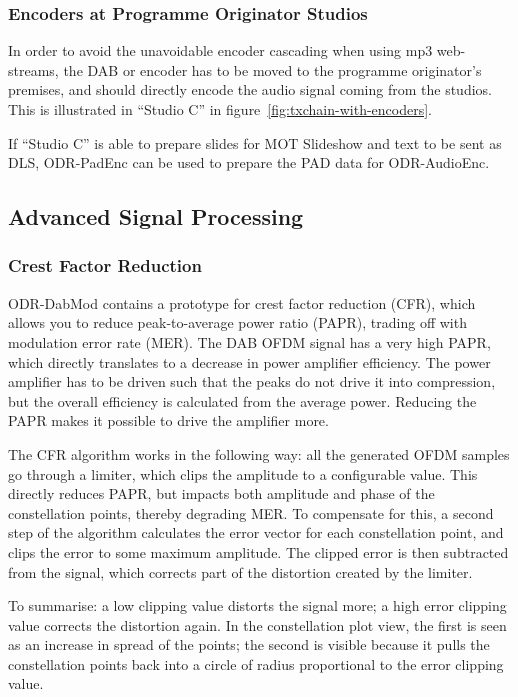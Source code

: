 \subsubsection{Encoders at Programme Originator Studios}
In order to avoid the unavoidable encoder cascading when using mp3 web-streams,
the DAB or \dabplus encoder has to be moved to the programme originator's
premises, and should directly encode the audio signal coming from the studios.
This is illustrated in ``Studio C'' in figure~\ref{fig:txchain-with-encoders}.

If ``Studio C'' is able to prepare slides for MOT Slideshow and text to be sent
as DLS, ODR-PadEnc can be used to prepare the PAD data for ODR-AudioEnc.


\subsection{Advanced Signal Processing}
\subsubsection{Crest Factor Reduction}
ODR-DabMod contains a prototype for crest factor reduction (CFR), which allows you to
reduce peak-to-average power ratio (PAPR), trading off with modulation error
rate (MER). The DAB OFDM signal has a very high PAPR, which directly translates
to a decrease in power amplifier efficiency. The power amplifier has to be
driven such that the peaks do not drive it into compression, but the overall
efficiency is calculated from the average power.
Reducing the PAPR makes it possible to drive the amplifier more.

The CFR algorithm works in the following way: all the generated OFDM samples go
through a limiter, which clips the amplitude to a configurable value. This
directly reduces PAPR, but impacts both amplitude and phase of the constellation
points, thereby degrading MER. To compensate for this, a second step of the
algorithm calculates the error vector for each constellation point, and clips
the error to some maximum amplitude. The clipped error is then subtracted from
the signal, which corrects part of the distortion created by the limiter.

To summarise: a low clipping value distorts the signal more; a high error
clipping value corrects the distortion again.
In the constellation plot view, the first is seen as an increase in spread of
the points; the second is visible because it pulls the constellation points back
into a circle of radius proportional to the error clipping value.

